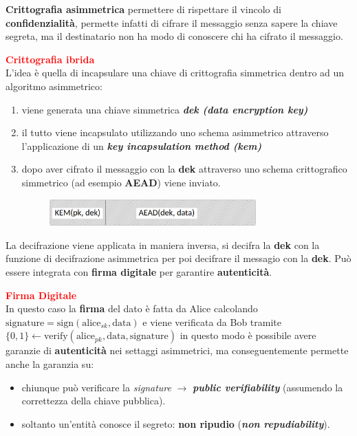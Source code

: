 \begin{flushleft}
    \smallskip

    \textbf{Crittografia asimmetrica} permettere di rispettare il vincolo di \textbf{confidenzialità}, permette infatti di cifrare il messaggio senza sapere la chiave segreta, ma il destinatario non ha modo di conoscere chi ha cifrato il messaggio.

    \medskip

    \textcolor{red}{\textbf{Crittografia ibrida}} \\
    L'idea è quella di incapsulare una chiave di crittografia simmetrica dentro ad un algoritmo asimmetrico:
    \begin{enumerate}[nosep]
        \item viene generata una chiave simmetrica \textbf{\textit{dek (data encryption key)}}
        \item il tutto viene incapsulato utilizzando uno schema asimmetrico attraverso l'applicazione di un \textbf{\textit{key incapsulation method (kem)}}
        \item dopo aver cifrato il messaggio con la \textbf{dek} attraverso uno schema crittografico simmetrico (ad esempio \textbf{AEAD}) viene inviato.

        \begin{figure}[h]
            \centering
            \includegraphics[width=0.75\textwidth]{img/hybrid_enc.png}
        \end{figure}
    \end{enumerate}
    La decifrazione viene applicata in maniera inversa, si decifra la \textbf{dek} con la funzione di decifrazione asimmetrica per poi decifrare il messagio con la \textbf{dek}. Può essere integrata con \textbf{firma digitale} per garantire \textbf{autenticità}.

    \medskip

    \textcolor{red}{\textbf{Firma Digitale}} \\
    In questo caso la \textbf{firma} del dato è fatta da Alice calcolando $\text{signature} = \text{sign}(\text{alice}_{sk}, \text{data})$ e viene verificata da Bob tramite $\{0, 1\} \leftarrow \text{verify}(\text{alice}_{pk}, \text{data}, \text{signature})$ in questo modo è possibile avere garanzie di \textbf{autenticità} nei settaggi asimmetrici, ma conseguentemente permette anche la garanzia su:
    \begin{itemize}[nosep]
        \item chiunque può verificare la \textit{signature} $\rightarrow$ \textbf{\textit{public verifiability}} (assumendo la correttezza della chiave pubblica).
        \item soltanto un'entità conosce il segreto: \textbf{non ripudio} (\textbf{\textit{non repudiability}}).
    \end{itemize}


\end{flushleft}
